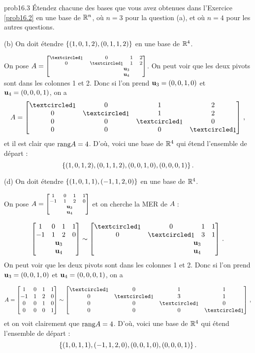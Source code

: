 \bigskip
\begin{sol}{prob16.3} Étendez chacune des bases que vous avez obtenues dans l'Exercice \ref{prob16.2} en une base de $\mathbb{R}^n$, où $n=3$ pour la question (a), et où $n=4$ pour les autres questions. 

\medskip
(b) On doit \'etendre $\{(1,0,1,2),(0,1,1,2)\}$ en une base de $\mathbb{R}^4$. \smallskip

On pose $A=\scriptsize\mat{\pivot&0&1&2\\0&\pivot&1&2\\ &&\hspace{-0.5cm}\uu_3 \\ && \hspace{-0.5cm}\uu_4}$. On peut voir que les deux pivots sont dans les colonnes 1 et 2. Donc si l'on prend $\mathbf{u}_3=(0,0,1,0)$ et $\mathbf{u}_4=(0,0,0,1)$, on a
$$A =\mat{\pivot&0&1&2\\0&\pivot&1&2\\ 0&0&\pivot&0\\ 0&0&0&\pivot}\,,$$ 
et il est clair que $\textrm{rang} A=4$. D'o\`u, voici une base de $\mathbb{R}^4$ qui \'etend l'ensemble de départ :
$$ \{(1,0,1,2),(0,1,1,2), (0,0,1,0),(0,0,0,1)\}\,.$$
\medskip

(d) On doit \'etendre $ \{(1,0,1,1),(-1,1,2,0)\}$ en une base de $\mathbb{R}^4$.\smallskip

On pose $A=\scriptsize\mat{1&0&1&1\\-1&1&2&0\\ &&\hspace{-0.5cm}\uu_3 \\ && \hspace{-0.5cm}\uu_4}$ et on cherche la MER de $A$ :

$$\mat{1&0&1&1\\-1&1&2&0\\ &&\hspace{-0.5cm}\uu_3 \\ && \hspace{-0.5cm}\uu_4} \sim \mat{
\pivot&0&1&1\\
0&\pivot&3&1\\ &&\hspace{-0.6cm}\uu_3 \\ && \hspace{-0.6cm}\uu_4}\,. $$ On peut voir que les deux pivots sont dans les colonnes 1 et 2. Donc si l'on prend  $\mathbf{u}_3=(0,0,1,0)$ et $\mathbf{u}_4=(0,0,0,1)$, on a 

$$A =\mat{1&0&1&1\\-1&1&2&0\\ 0&0&1&0\\ 0&0&0&1}\sim \mat{
\pivot&0&1&1\\
0&\pivot&3&1\\ 0&0&\pivot&0 \\ 0&0&0&\pivot}\,, $$
et on voit clairement que $\textrm{rang} A=4$.  D'o\`u, voici une base de $\mathbb{R}^4$ qui \'etend l'ensemble de départ :
$$  \{(1,0,1,1),(-1,1,2,0), (0,0,1,0),(0,0,0,1)\}\,.$$
\medskip
\end{sol}

